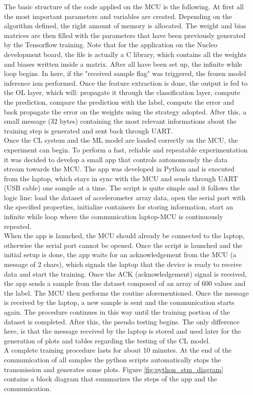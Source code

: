 \documentclass[12pt]{report}
\begin{document}
The basic structure of the code applied on the MCU is the following. At first all the most important parameters and variables are created. Depending on the algorithm defined, the right amount of memory is allocated. The weight and bias matrices are then filled with the parameters that have been previously generated by the Tensorflow training. Note that for the application on the Nucleo development board, the file is actually a C library, which contains all the weights and biases written inside a matrix. After all have been set up, the infinite while loop begins. In here, if the "received sample flag" was triggered, the frozen model inference ism performed. Once the feature extraction is done, the output is fed to the OL layer, which will: propagate it through the classification layer, compute the prediction, compare the prediction with the label, compute the error and back propagate the error on the weights using the strategy adopted. After this, a small message (32 bytes) containing the most relevant informations about the training step is generated and sent back through UART.\\
Once the CL system and the ML model are loaded correctly on the MCU, the experiment can begin. To perform a fast, reliable and repeatable experimentation it was decided to develop a small app that controls autonomously the data stream towards the MCU. The app was developed in Python and is executed from the laptop, which stays in sync with the MCU and sends through UART (USB cable) one sample at a time. The script is quite simple and it follows the logic line: load the dataset of accelerometer array data, open the serial port with the specified properties, initialize containers for storing information, start an infinite while loop where the communication laptop-MCU is continuously repeated. \\
When the app is launched, the MCU should already be connected to the laptop, otherwise the serial port cannot be opened. Once the script is launched and the initial setup is done, the app waits for an acknowledgement from the MCU (a message of 2 chars), which signals the laptop that the device is ready to receive data and start the training. Once the ACK (acknowledgement) signal is received, the app sends a sample from the dataset composed of an array of 600 values and the label. The MCU then performs the routine aforementioned. Once the message is received by the laptop, a new sample is sent and the communication starts again. The procedure continues in this way until the training portion of the dataset is completed. After this, the pseudo testing begins. The only difference here, is that the message received by the laptop is stored and used later for the generation of plots and tables regarding the testing of the CL model.\\
A complete training procedure lasts for about 10 minutes. At the end of the communication of all samples the python scripts automatically stops the transmission and generates some plots. Figure \ref{fig:python_stm_diagram} contains a block diagram that summarizes the steps of the app and the communication.
\end{document}
